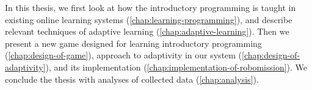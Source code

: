 

In this thesis, we first look at how the introductory programming is taught
in existing online learning systems
(\cref{chap:learning-programming}),
and describe relevant techniques of adaptive learning
(\cref{chap:adaptive-learning}).
Then we present a new game designed for learning introductory programming
(\cref{chap:design-of-game}),
approach to adaptivity in our system (\cref{chap:design-of-adaptivity}),
and its implementation (\cref{chap:implementation-of-robomission}).
We conclude the thesis with analyses of collected data
(\cref{chap:analysis}).
